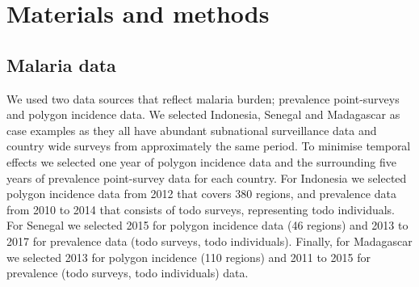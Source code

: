 \documentclass{statsoc}
\begin{document}




\section*{Materials and methods}


\subsection*{Malaria data}

We used two data sources that reflect malaria burden; prevalence point-surveys and polygon incidence data.
We selected Indonesia, Senegal and Madagascar as case examples as they all have abundant subnational surveillance data and country wide surveys from approximately the same period.
To minimise temporal effects we selected one year of polygon incidence data and the surrounding five years of prevalence point-survey data for each country.
For Indonesia we selected polygon incidence data from 2012 that covers 380 regions, and prevalence data from 2010 to 2014 that consists of todo surveys, representing todo individuals.
For Senegal we selected 2015 for polygon incidence data (46 regions) and 2013 to 2017 for prevalence data (todo surveys, todo individuals).
Finally, for Madagascar we selected 2013 for polygon incidence (110 regions) and 2011 to 2015 for prevalence (todo surveys, todo individuals) data.
\end{document}

